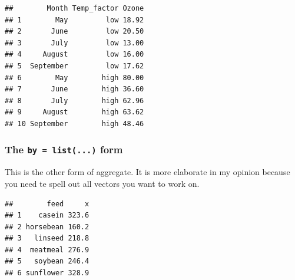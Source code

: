 \documentclass[]{book}
\newenvironment{Shaded}{\begin{snugshade}}{\end{snugshade}}
\newcommand{\DataTypeTok}[1]{\textcolor[rgb]{0.13,0.29,0.53}{#1}}
\newcommand{\DecValTok}[1]{\textcolor[rgb]{0.00,0.00,0.81}{#1}}
\newcommand{\KeywordTok}[1]{\textcolor[rgb]{0.13,0.29,0.53}{\textbf{#1}}}
\newcommand{\NormalTok}[1]{#1}
\newcommand{\OperatorTok}[1]{\textcolor[rgb]{0.81,0.36,0.00}{\textbf{#1}}}
\newcommand{\StringTok}[1]{\textcolor[rgb]{0.31,0.60,0.02}{#1}}
\begin{document}
\begin{Shaded}
\end{Shaded}

\begin{verbatim}
##        Month Temp_factor Ozone
## 1        May         low 18.92
## 2       June         low 20.50
## 3       July         low 13.00
## 4     August         low 16.00
## 5  September         low 17.62
## 6        May        high 80.00
## 7       June        high 36.60
## 8       July        high 62.96
## 9     August        high 63.62
## 10 September        high 48.46
\end{verbatim}

\hypertarget{the-by-list...-form}{%
\subsubsection*{\texorpdfstring{The \texttt{by\ =\ list(...)} form}{The by = list(...) form}}\label{the-by-list...-form}}

This is the other form of aggregate. It is more elaborate in my opinion because you need te spell out all vectors you want to work on.

\begin{Shaded}
\end{Shaded}

\begin{verbatim}
##        feed     x
## 1    casein 323.6
## 2 horsebean 160.2
## 3   linseed 218.8
## 4  meatmeal 276.9
## 5   soybean 246.4
## 6 sunflower 328.9
\end{verbatim}
\end{document}
